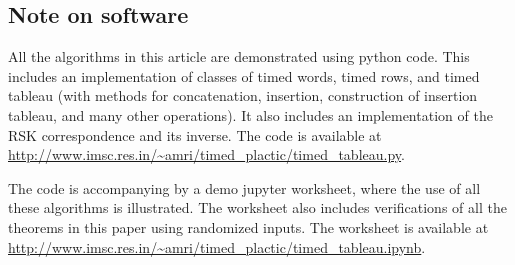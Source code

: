 \documentclass[10pt]{amsproc}
\theoremstyle{definition}
\theoremstyle{remark}
\begin{document}
\subsection{Note on software}
\label{sec:software}

All the algorithms in this article are demonstrated using python code.
This includes an implementation of classes of timed words, timed rows, and timed tableau (with methods for concatenation, insertion, construction of insertion tableau, and many other operations).
It also includes an implementation of the RSK correspondence and its inverse.
The code is available at \url{http://www.imsc.res.in/~amri/timed_plactic/timed_tableau.py}.

The code is accompanying by a demo jupyter worksheet, where the use of all these algorithms is illustrated.
The worksheet also includes verifications of all the theorems in this paper using randomized inputs.
The worksheet is available at \url{http://www.imsc.res.in/~amri/timed_plactic/timed_tableau.ipynb}.


\end{document}
